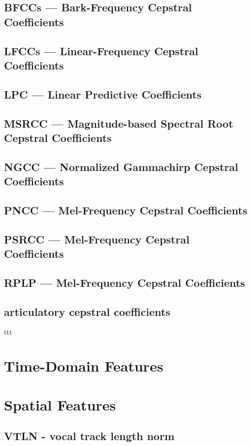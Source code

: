 \subsection{BFCCs --- Bark-Frequency Cepstral Coefficients}
\subsection{LFCCs --- Linear-Frequency Cepstral Coefficients}
\subsection{LPC --- Linear Predictive Coefficients}
\subsection{MSRCC --- Magnitude-based Spectral Root Cepstral Coefficients}
\subsection{NGCC --- Normalized Gammachirp Cepstral Coefficients}
\subsection{PNCC --- Mel-Frequency Cepstral Coefficients}
\subsection{PSRCC --- Mel-Frequency Cepstral Coefficients}
\subsection{RPLP --- Mel-Frequency Cepstral Coefficients}
\subsection{articulatory cepstral coefficients}
ttt

\section{Time-Domain Features}

\section{Spatial Features}
\subsection{VTLN - vocal track length norm}
